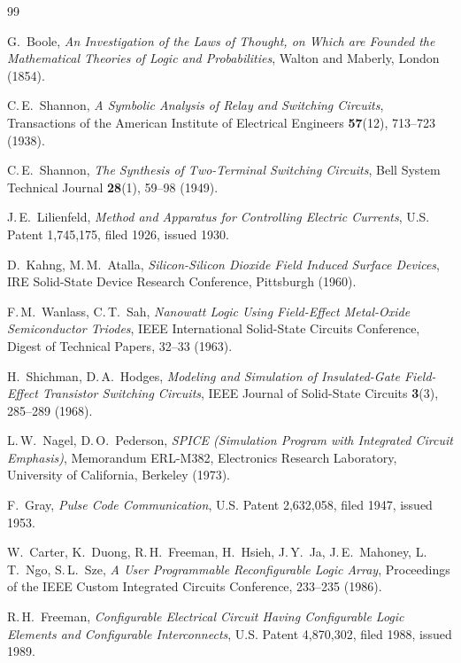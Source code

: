 \documentclass[11pt,a4paper]{article}
\begin{document}
\begin{thebibliography}{99}

 G.~Boole,
\emph{An Investigation of the Laws of Thought, on Which are Founded the
Mathematical Theories of Logic and Probabilities},
Walton and Maberly, London (1854).

 C.\,E.~Shannon,
\emph{A Symbolic Analysis of Relay and Switching Circuits},
Transactions of the American Institute of Electrical Engineers
\textbf{57}(12), 713--723 (1938).

 C.\,E.~Shannon,
\emph{The Synthesis of Two-Terminal Switching Circuits},
Bell System Technical Journal \textbf{28}(1), 59--98 (1949).

 J.\,E.~Lilienfeld,
\emph{Method and Apparatus for Controlling Electric Currents},
U.S. Patent 1,745,175, filed 1926, issued 1930.

 D.~Kahng, M.\,M.~Atalla,
\emph{Silicon-Silicon Dioxide Field Induced Surface Devices},
IRE Solid-State Device Research Conference, Pittsburgh (1960).

 F.\,M.~Wanlass, C.\,T.~Sah,
\emph{Nanowatt Logic Using Field-Effect Metal-Oxide Semiconductor
Triodes},
IEEE International Solid-State Circuits Conference, Digest of
Technical Papers, 32--33 (1963).

 H.~Shichman, D.\,A.~Hodges,
\emph{Modeling and Simulation of Insulated-Gate Field-Effect
Transistor Switching Circuits},
IEEE Journal of Solid-State Circuits \textbf{3}(3), 285--289 (1968).

 L.\,W.~Nagel, D.\,O.~Pederson,
\emph{SPICE (Simulation Program with Integrated Circuit Emphasis)},
Memorandum ERL-M382, Electronics Research Laboratory, University of
California, Berkeley (1973).

 F.~Gray,
\emph{Pulse Code Communication},
U.S. Patent 2,632,058, filed 1947, issued 1953.

 W.~Carter, K.~Duong, R.\,H.~Freeman, H.~Hsieh,
J.\,Y.~Ja, J.\,E.~Mahoney, L.\,T.~Ngo, S.\,L.~Sze,
\emph{A User Programmable Reconfigurable Logic Array},
Proceedings of the IEEE Custom Integrated Circuits Conference,
233--235 (1986).

 R.\,H.~Freeman,
\emph{Configurable Electrical Circuit Having Configurable Logic
Elements and Configurable Interconnects},
U.S. Patent 4,870,302, filed 1988, issued 1989.


\end{thebibliography}
\end{document}
